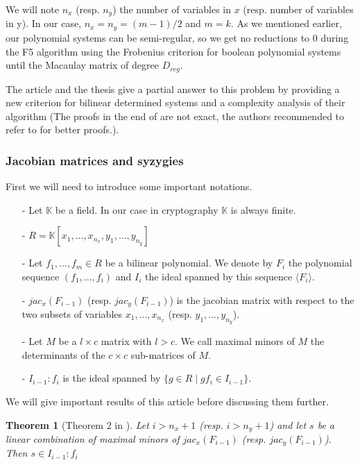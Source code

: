\documentclass[english]{article}
\newtheorem{theorem}{Theorem}[section]
\begin{document}
		We will note $n_x$ (resp. $n_y$) the number of variables in $x$ (resp. number of variables in y). In our case, $n_x = n_y = (m-1)/2$ and $m = k$. As we mentioned earlier, our polynomial systems can be semi-regular, so we get no reductions to 0 during the F5 algorithm using the Frobenius criterion for boolean polynomial systems until the Macaulay matrix of degree $D_{reg}$.
		
		The article \cite{FSS11} and the thesis \cite{Spaen2012} give a partial answer to this problem by providing a new criterion for bilinear determined systems and a complexity analysis of their algorithm (The proofs in the end of \cite{FSS11} are not exact, the authors recommended to refer to \cite{Spaen2012} for better proofs.).
		
		\subsubsection{Jacobian matrices and syzygies}
		First we will need to introduce some important notations.
		\begin{itemize}
			\item[-] Let $\mathbb{K}$ be a field. In our case in cryptography $\mathbb{K}$ is always finite.
			\item[-] $R = \mathbb{K}[x_1,...,x_{n_x},y_1,...,y_{n_y}]$
			\item[-] Let $f_1,...,f_m \in R$ be a bilinear polynomial. We denote by $F_i$ the polynomial sequence $(f_1,...,f_i)$ and $I_i$ the ideal spanned by this sequence $\langle F_i \rangle$.
			\item[-] $jac_{x}(F_{i-1})$ (resp. $jac_{y}(F_{i-1})$) is the jacobian matrix with respect to the two subsets of variables $x_1,...,x_{n_x}$ (resp. $y_1,...,y_{n_y}$).
			\item[-] Let $M$ be a $l \times c$ matrix with $l > c$. We call maximal minors of $M$ the determinants of the $c \times c$ sub-matrices of $M$. 
			\item[-] $I_{i-1} : f_i$ is the ideal spanned by $\{g \in R \mid gf_i \in I_{i-1}\}$.
		\end{itemize}
		We will give important results of this article before discussing them further.
		
		\begin{theorem}[Theorem 2 in \cite{FSS11}]\label{theoremMaxMin}
			Let $i > n_x + 1$ (resp. $i > n_y + 1$) and let $s$ be a linear combination of maximal minors of $jac_{x}(F_{i-1})$ (resp. $jac_{y}(F_{i-1})$). Then $s \in I_{i-1} : f_i$
		\end{theorem}
		
\end{document}
